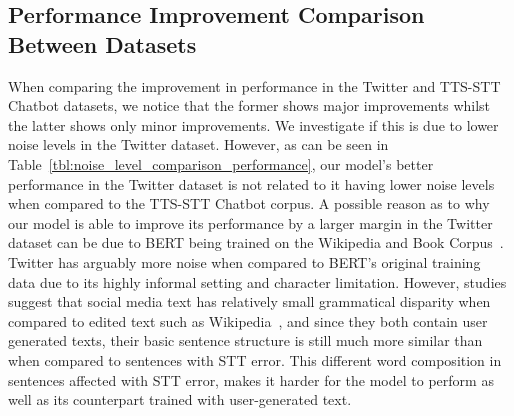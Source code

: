 \documentclass[review]{elsarticle}
\begin{document}
\begin{table}[ht!]
    \centering
    \caption{Macro-average precision (P), recall (R), and F1 scores (\%) for the Chatbot Intent Classification Corpus with the original sentences (complete data) and sentences imbued with TTS-STT error (\textit{gtts-witai} and \textit{macsay-witai}).}
    \label{tbl:macro_results_chatbot}
\end{table}

\subsection{Performance Improvement Comparison Between Datasets}
When comparing the improvement in performance in the Twitter and TTS-STT Chatbot datasets, we notice that the former shows major improvements whilst the latter shows only minor improvements. We investigate if this is due to lower noise levels in the Twitter dataset. However, as can be seen in Table~\ref{tbl:noise_level_comparison_performance}, our model’s better performance in the Twitter dataset is not related to it having lower noise levels when compared to the TTS-STT Chatbot corpus. A possible reason as to why our model is able to improve its performance by a larger margin in the Twitter dataset can be due to BERT being trained on the Wikipedia and Book Corpus~\cite{devlin2018bert}. Twitter has arguably more noise when compared to BERT’s original training data due to its highly informal setting and character limitation. However, studies suggest that social media text has relatively small grammatical disparity when compared to edited text such as Wikipedia~\cite{baldwin2013noisy}, and since they both contain user generated texts, their basic sentence structure is still much more similar than when compared to sentences with STT error. This different word composition in sentences affected with STT error, makes it harder for the model to perform as well as its counterpart trained with user-generated text.
\end{document}
